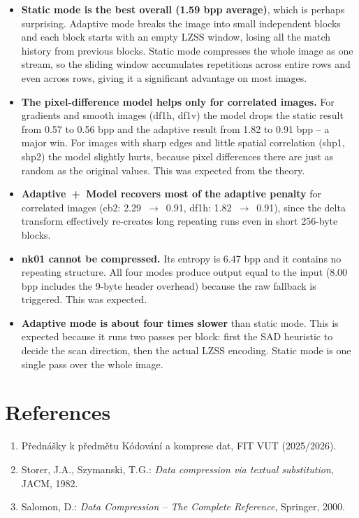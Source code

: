 \documentclass[a4paper,11pt]{article}
\begin{document}
\begin{itemize}\setlength\itemsep{2pt}
  \item \textbf{Static mode is the best overall (1.59 bpp average)}, which
        is perhaps surprising.  Adaptive mode breaks the image into small
        independent blocks and each block starts with an empty LZSS window,
        losing all the match history from previous blocks.  Static mode
        compresses the whole image as one stream, so the sliding window
        accumulates repetitions across entire rows and even across rows,
        giving it a significant advantage on most images.

  \item \textbf{The pixel-difference model helps only for correlated images.}
        For gradients and smooth images (df1h, df1v) the model drops the
        static result from 0.57 to 0.56 bpp and the adaptive result from
        1.82 to 0.91 bpp -- a major win.  For images with sharp edges and
        little spatial correlation (shp1, shp2) the model slightly hurts,
        because pixel differences there are just as random as the original
        values.  This was expected from the theory.

  \item \textbf{Adaptive~+~Model recovers most of the adaptive penalty} for
        correlated images (cb2: 2.29~$\to$~0.91, df1h: 1.82~$\to$~0.91),
        since the delta transform effectively re-creates long repeating runs
        even in short 256-byte blocks.

  \item \textbf{nk01 cannot be compressed.}  Its entropy is 6.47 bpp and
        it contains no repeating structure.  All four modes produce output
        equal to the input (8.00 bpp includes the 9-byte header overhead)
        because the raw fallback is triggered.  This was expected.

  \item \textbf{Adaptive mode is about four times slower} than static mode.
        This is expected because it runs two passes per block: first the SAD
        heuristic to decide the scan direction, then the actual LZSS
        encoding.  Static mode is one single pass over the whole image.
\end{itemize}

\section*{References}

\begin{enumerate}\setlength\itemsep{1pt}
  \item Přednášky k předmětu Kódování a komprese dat, FIT VUT (2025/2026).
  \item Storer, J.A., Szymanski, T.G.: \emph{Data compression via textual substitution},
        JACM, 1982.
  \item Salomon, D.: \emph{Data Compression -- The Complete Reference},
        Springer, 2000.
\end{enumerate}
\end{document}
